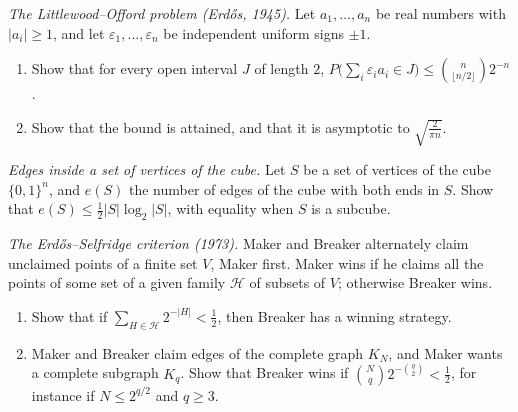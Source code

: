 \begin{exercise}[$\star\star$]\label{pb:littlewoodofford}
\emph{The Littlewood--Offord problem (Erdős, 1945).} Let $a_1,\dots,a_n$ be real numbers with $|a_i|\ge1$, and let $\varepsilon_1,\dots,\varepsilon_n$ be
independent uniform signs $\pm1$.
\begin{enumerate}[label=(\alph*)]
\item Show that for every open interval $J$ of length $2$, $P\bigl(\sum_i\varepsilon_ia_i\in J\bigr)\le\binom n{\lfloor n/2\rfloor}2^{-n}$.
\item Show that the bound is attained, and that it is asymptotic to $\sqrt{\frac2{\pi n}}$.
\end{enumerate}
\end{exercise}

\begin{exercise}[$\star\star$]\label{pb:cubeiso}
\emph{Edges inside a set of vertices of the cube.} Let $S$ be a set of vertices of the cube $\{0,1\}^n$, and $e(S)$ the number of edges of
the cube with both ends in $S$. Show that $e(S)\le\frac12|S|\log_2|S|$, with equality when $S$ is a subcube.
\end{exercise}

\begin{exercise}[$\star\star$]\label{pb:erdosselfridge}
\emph{The Erdős--Selfridge criterion (1973).} Maker and Breaker alternately claim unclaimed points of a finite set $V$, Maker first.
Maker wins if he claims all the points of some set of a given family $\mathcal H$ of subsets of $V$; otherwise Breaker wins.
\begin{enumerate}[label=(\alph*)]
\item Show that if $\sum_{H\in\mathcal H}2^{-|H|}<\frac12$, then Breaker has a winning strategy.
\item Maker and Breaker claim edges of the complete graph $K_N$, and Maker wants a complete subgraph $K_q$. Show that Breaker wins if
$\binom Nq2^{-\binom q2}<\frac12$, for instance if $N\le2^{q/2}$ and $q\ge3$.
\end{enumerate}
\end{exercise}


